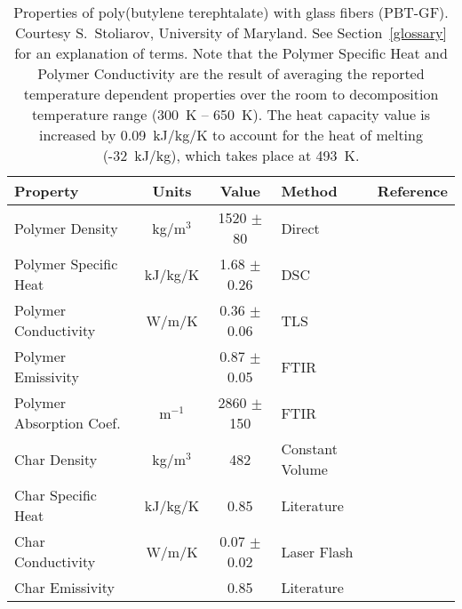 \begin{table}[h!]
\caption[Properties of poly(butylene terephtalate) with glass fibers (PBT-GF)]{Properties of poly(butylene terephtalate) with glass fibers (PBT-GF).
Courtesy S.~Stoliarov, University of Maryland. See Section~\ref{glossary} for an explanation of terms. Note that the Polymer Specific Heat and Polymer Conductivity
are the result of averaging the reported temperature dependent properties over the room to decomposition temperature range (300~K -- 650~K).
The heat capacity value is increased by 0.09~kJ/kg/K to account for the heat of melting (-32~kJ/kg), which takes place at 493~K.}
\begin{center}
\begin{tabular}{|l|c|c|l|l|}
\hline
Property                &      Units    &      Value                        & Method                                    & Reference                     \\ \hline \hline
Polymer Density         &     kg/m$^3$  & 1520 $\pm$ 80                     & Direct                                    & \cite{Kempel:1}               \\ \hline
Polymer Specific Heat   &    kJ/kg/K    & 1.68 $\pm$ 0.26                   & DSC                                       & \cite{Kempel:1}               \\ \hline
Polymer Conductivity    &      W/m/K    & 0.36 $\pm$ 0.06                   & TLS                                       & \cite{Kempel:1}               \\ \hline
Polymer Emissivity      &               & 0.87 $\pm$ 0.05                   & FTIR                                      & \cite{Linteris:2}             \\ \hline
Polymer Absorption Coef.&  m$^{-1}$     & 2860 $\pm$ 150                    & FTIR                                      & \cite{Linteris:2}             \\ \hline
Char Density            &     kg/m$^3$  &        482                        & Constant Volume                           & \cite{Kempel:1}               \\ \hline
Char Specific Heat      &    kJ/kg/K    &        0.85                       & Literature                                & \cite{SCHOTT}                 \\ \hline
Char Conductivity       &      W/m/K    & 0.07 $\pm$ 0.02                   & Laser Flash                               & \cite{Kempel:1}               \\ \hline
Char Emissivity         &               &       0.85                        & Literature                                & \cite{Braeuer:1}              \\ \hline

\end{tabular}
\end{center}
\end{table}
